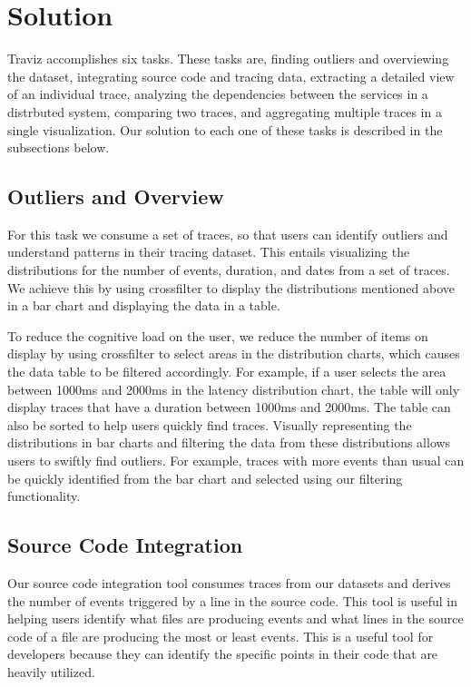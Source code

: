 \section{Solution}

Traviz accomplishes six tasks. These tasks are, finding outliers and overviewing the dataset, 
integrating source code and tracing data, extracting a detailed view of an individual trace, analyzing the
dependencies between the services in a distrbuted system, comparing two traces, and aggregating multiple traces
in a single visualization. Our solution to each one of these tasks is described in the subsections below.

\subsection{Outliers and Overview}

For this task we consume a set of traces, so that users can identify outliers and understand patterns
in their tracing dataset. This entails visualizing the distributions for the number of events, duration, 
and dates from a set of traces. We achieve this by
using crossfilter to display the distributions mentioned above in a bar chart and displaying the data in a table. 

To reduce the cognitive load on the user, we reduce the number of items on display by using crossfilter
to select areas in the distribution charts, which causes the data table to be filtered accordingly. For example,
if a user selects the area between 1000ms and 2000ms in the latency distribution chart, the table will only display
traces that have a duration between 1000ms and 2000ms. The table can also be sorted to help users quickly find traces. 
Visually representing the distributions in bar charts and filtering the data from these distributions allows users to swiftly
find outliers. For example, traces with more events than usual can be quickly identified from the bar chart and selected using our
filtering functionality.

\subsection{Source Code Integration}

Our source code integration tool consumes traces from our datasets and derives the number of events
triggered by a line in the source code. This tool is useful in helping users identify what files are producing events
and what lines in the source code of a file are producing the most or least events. This is a useful tool for developers because
they can identify the specific points in their code that are heavily utilized. 

